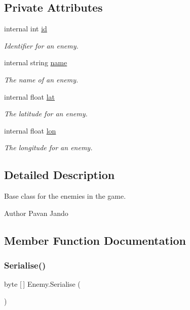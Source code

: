 \subsection*{Private Attributes}
\begin{DoxyCompactItemize}
\item 
internal int \mbox{\hyperlink{class_enemy_a2462522193197ea0458942f19704599b}{id}}
\begin{DoxyCompactList}\small\item\em Identifier for an enemy. \end{DoxyCompactList}\item 
internal string \mbox{\hyperlink{class_enemy_a76e75afdb1a83151f0b816c375995b64}{name}}
\begin{DoxyCompactList}\small\item\em The name of an enemy. \end{DoxyCompactList}\item 
internal float \mbox{\hyperlink{class_enemy_adda4a5f0af5eb4dc061e162ee46e940c}{lat}}
\begin{DoxyCompactList}\small\item\em The latitude for an enemy. \end{DoxyCompactList}\item 
internal float \mbox{\hyperlink{class_enemy_a8ae77cbcd385c768eb0649a31718a08e}{lon}}
\begin{DoxyCompactList}\small\item\em The longitude for an enemy. \end{DoxyCompactList}\end{DoxyCompactItemize}


\subsection{Detailed Description}
Base class for the enemies in the game. 

\begin{DoxyAuthor}{Author}
Pavan Jando
\end{DoxyAuthor}


\subsection{Member Function Documentation}
\mbox{\label{class_enemy_aa2dcacb6e604b61d81603f5a9ca7599b}} 
\subsubsection{\texorpdfstring{Serialise()}{Serialise()}}
{\footnotesize\ttfamily byte \mbox{[}$\,$\mbox{]} Enemy.\+Serialise (\begin{DoxyParamCaption}{ }\end{DoxyParamCaption})}



